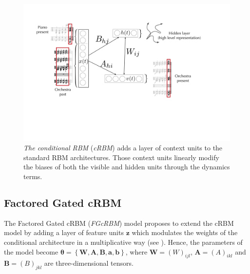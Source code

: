 \documentclass{article}
\begin{document}
\begin{figure}[ht]
\centering
\includegraphics[scale=0.26]{Models/cRBM/cRBM_orch}
\caption{\textit{The conditional RBM} (\textit{cRBM}) adds a layer of context units to the standard RBM architectures. Those context units linearly modify the biases of both the visible and hidden units through the dynamics terms.}
\label{fig:cRBM_orchestration}
\end{figure}

\subsection{Factored Gated cRBM}
The Factored Gated cRBM (\textit{FGcRBM}) model  \cite{taylor2009factored} proposes to extend the cRBM model by adding a layer of feature units $\bm{z}$ which modulates the weights of the conditional architecture in a multiplicative way (see ). Hence, the parameters of the model become $\bm{\theta} = \left\lbrace \bm{W} , \bm{A} , \bm{B} , \bm{a} , \bm{b} \right\rbrace$, where $\bm{W} = (W)_{ijl}$, $\bm{A}=(A)_{ikl}$ and $\bm{B}=(B)_{jkl}$ are three-dimensional tensors.
\end{document}
